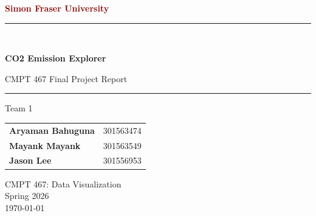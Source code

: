 \begin{titlepage}
\thispagestyle{empty}
\begin{center}
{\Huge \textbf{\textcolor{darkred}{Simon Fraser University}} \par}
\vspace{1.2cm}

\newcommand{\HRule}{\rule{\linewidth}{0.6mm}}
\HRule \\[0.45cm]
{\LARGE \bfseries CO2 Emission Explorer \par}
\vspace{0.2cm}
{\large CMPT 467 Final Project Report \par}
\HRule

\vspace{2.0cm}

{\Large Team 1 \par}
\vspace{1.0cm}

\begin{tabular}{ll}
\textbf{Aryaman Bahuguna} & 301563474 \\
\textbf{Mayank Mayank} & 301563549 \\
\textbf{Jason Lee} & 301556953 \\
\end{tabular}

\vfill

CMPT 467: Data Visualization \\
Spring 2026 \\
\today
\end{center}
\end{titlepage}
